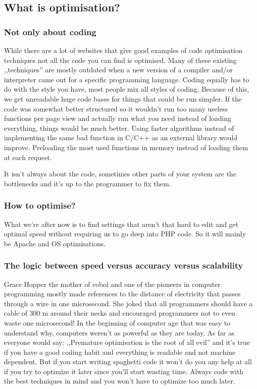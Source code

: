 \subsection{What is optimisation?}
\subsubsection{Not only about coding}
While there are a lot of websites that give good examples of code optimisation techniques not all the code
you can find is optimised. Many of these existing ,,techniques'' are mostly outdated when a new version
of a compiler and/or interpreter came out for a specific programming language. Coding equally has to
do with the style you have, most people mix all styles of coding. Because of this, we get unreadable huge
code bases for things that could be run simpler. If the code was somewhat better structured so it wouldn't
run too many useless functions per page view and actually run what you need instead of loading
everything, things would be much better. Using faster algorithms instead of implementing the same bad
function in C/C++ as an external library would improve. Preloading the most used functions in memory instead of loading them at each request.

It isn't always about the code, sometimes other parts of your system are the bottlenecks and it's up to the
programmer to fix them.\cite{phplens_optimising_tips}
\subsubsection{How to optimise?}
What we're after now is to find settings that aren't that hard to edit and get optimal speed without
requiring us to go deep into PHP code. So it will mainly be Apache and OS optimisations.

\subsubsection{The logic between speed versus accuracy versus scalability}
Grace Hopper the mother of \gls{cobol} and one of the pioneers in computer programming mostly made
references to the distance of electricity that passes through a wire in one microsecond. She joked that all
programmers should have a cable of 300 m around their necks\cite{graceHopper_story} and encouraged programmers not to even
waste one microsecond! In the beginning of computer age that was easy to understand why, computers
weren't as powerful as they are today. As far as everyone would say: ,,Premature optimisation is the root
of all evil'' and it's true if you have a good coding habit and everything is readable and not machine
dependent. But if you start writing spaghetti code it won't do you any help at all if you try to optimize it
later since you'll start wasting time. Always code with the best techniques in mind and you won't have to
optimize too much later.

